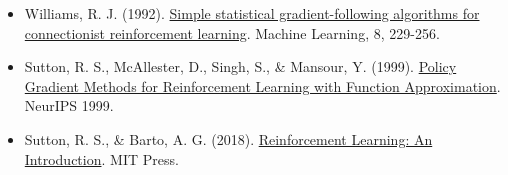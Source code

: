 \vspace{0.25em}
\begin{itemize}
\tightlist
\item
  Williams, R. J. (1992). \href{https://doi.org/10.1007/BF00992696}{Simple statistical gradient-following algorithms for connectionist reinforcement learning}. Machine Learning, 8, 229-256.
\item
  Sutton, R. S., McAllester, D., Singh, S., \& Mansour, Y. (1999). \href{https://proceedings.neurips.cc/paper/1999/hash/464d828b85b0bed98e80ade0a5c43b0f-Abstract.html}{Policy Gradient Methods for Reinforcement Learning with Function Approximation}. NeurIPS 1999.
\item
  Sutton, R. S., \& Barto, A. G. (2018). \href{http://incompleteideas.net/book/the-book-2nd.html}{Reinforcement Learning: An Introduction}. MIT Press.
\end{itemize}

\clearpage
